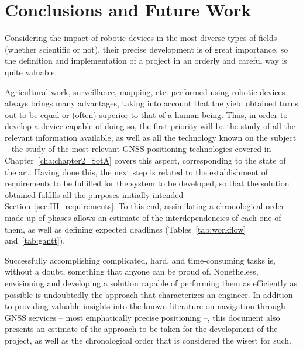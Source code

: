 

\chapter{Conclusions and Future Work}\label{cha:chapter6_ConclusionsFuture}

Considering the impact of robotic devices in the most diverse types of fields (whether scientific or not), their precise development is of great importance, so the definition and implementation of a project in an orderly and careful way is quite valuable.

Agricultural work, surveillance, mapping, etc. performed using robotic devices always brings many advantages, taking into account that the yield obtained turns out to be equal or (often) superior to that of a human being.
Thus, in order to develop a device capable of doing so, the first priority will be the study of all the relevant information available, as well as all the technology known on the subject -- the study of the most relevant GNSS positioning technologies covered in Chapter~\ref{cha:chapter2_SotA} covers this aspect, corresponding to the state of the art.
Having done this, the next step is related to the establishment of requirements to be fulfilled for the system to be developed, so that the solution obtained fulfills all the purposes initially intended -- Section~\ref{sec:III_requirements}. To this end, assimilating a chronological order made up of phases allows an estimate of the interdependencies of each one of them, as well as defining expected deadlines (Tables~\ref{tab:workflow} and~\ref{tab:gantt}).\\

\par Successfully accomplishing complicated, hard, and time-consuming tasks is, without a doubt, something that anyone can be proud of. Nonetheless, envisioning and developing a solution capable of performing them as efficiently as possible is undoubtedly the approach that characterizes an engineer. In addition to providing valuable insights into the known literature on navigation through GNSS services -- most emphatically precise positioning --, this document also presents an estimate of the approach to be taken for the development of the project, as well as the chronological order that is considered the wisest for such.

